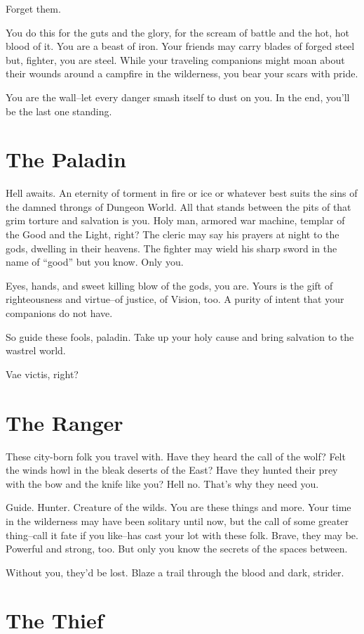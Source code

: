  Forget them.


 You do this for the guts and the glory, for the scream of battle and the hot, hot blood of it. You are a beast of iron. Your friends may carry blades of forged steel but, fighter, you are steel. While your traveling companions might moan about their wounds around a campfire in the wilderness, you bear your scars with pride.


 You are the wall--let every danger smash itself to dust on you. In the end, you'll be the last one standing.
\section{The Paladin}


 Hell awaits. An eternity of torment in fire or ice or whatever best suits the sins of the damned throngs of Dungeon World. All that stands between the pits of that grim torture and salvation is you. Holy man, armored war machine, templar of the Good and the Light, right? The cleric may say his prayers at night to the gods, dwelling in their heavens. The fighter may wield his sharp sword in the name of ``good'' but you know. Only you.


 Eyes, hands, and sweet killing blow of the gods, you are. Yours is the gift of righteousness and virtue--of justice, of Vision, too. A purity of intent that your companions do not have.


 So guide these fools, paladin. Take up your holy cause and bring salvation to the wastrel world.


 Vae victis, right?
\section{The Ranger}


 These city-born folk you travel with. Have they heard the call of the wolf? Felt the winds howl in the bleak deserts of the East? Have they hunted their prey with the bow and the knife like you? Hell no. That's why they need you.


 Guide. Hunter. Creature of the wilds. You are these things and more. Your time in the wilderness may have been solitary until now, but the call of some greater thing--call it fate if you like--has cast your lot with these folk. Brave, they may be. Powerful and strong, too. But only you know the secrets of the spaces between.


 Without you, they'd be lost. Blaze a trail through the blood and dark, strider.
\section{The Thief}


